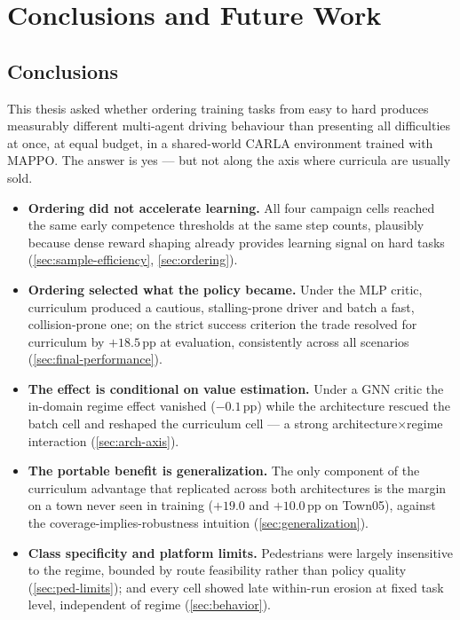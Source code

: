 \chapter{Conclusions and Future Work}
\label{ch:conclusions}

\section{Conclusions}
\label{sec:conclusions}

This thesis asked whether ordering training tasks from easy to hard
produces measurably different multi-agent driving behaviour than
presenting all difficulties at once, at equal budget, in a shared-world
CARLA environment trained with MAPPO. The answer is yes --- but not
along the axis where curricula are usually sold.

\begin{itemize}
  \item \textbf{Ordering did not accelerate learning.} All four campaign
        cells reached the same early competence thresholds at the same
        step counts, plausibly because dense reward shaping already
        provides learning signal on hard tasks
        (\cref{sec:sample-efficiency}, \cref{sec:ordering}).
  \item \textbf{Ordering selected what the policy became.} Under the MLP
        critic, curriculum produced a cautious, stalling-prone driver
        and batch a fast, collision-prone one; on the strict success
        criterion the trade resolved for curriculum by $+18.5$\,pp at
        evaluation, consistently across all scenarios
        (\cref{sec:final-performance}).
  \item \textbf{The effect is conditional on value estimation.} Under a
        GNN critic the in-domain regime effect vanished
        ($-0.1$\,pp) while the architecture rescued the batch cell and
        reshaped the curriculum cell --- a strong
        architecture$\times$regime interaction
        (\cref{sec:arch-axis}).
  \item \textbf{The portable benefit is generalization.} The only
        component of the curriculum advantage that replicated across
        both architectures is the margin on a town never seen in
        training ($+19.0$ and $+10.0$\,pp on Town05), against the
        coverage-implies-robustness intuition
        (\cref{sec:generalization}).
  \item \textbf{Class specificity and platform limits.} Pedestrians were
        largely insensitive to the regime, bounded by route feasibility
        rather than policy quality (\cref{sec:ped-limits}); and every
        cell showed late within-run erosion at fixed task level,
        independent of regime (\cref{sec:behavior}).
\end{itemize}

